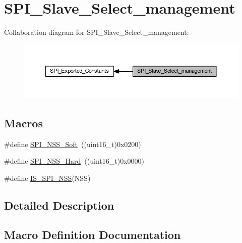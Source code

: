 \hypertarget{group___s_p_i___slave___select__management}{}\section{S\+P\+I\+\_\+\+Slave\+\_\+\+Select\+\_\+management}
\label{group___s_p_i___slave___select__management}
Collaboration diagram for S\+P\+I\+\_\+\+Slave\+\_\+\+Select\+\_\+management\+:
\nopagebreak
\begin{figure}[H]
\begin{center}
\leavevmode
\includegraphics[width=350pt]{group___s_p_i___slave___select__management}
\end{center}
\end{figure}
\subsection*{Macros}
\begin{DoxyCompactItemize}
\item 
\#define \hyperlink{group___s_p_i___slave___select__management_ga105969ee7eb635414da35b41e942e383}{S\+P\+I\+\_\+\+N\+S\+S\+\_\+\+Soft}~((uint16\+\_\+t)0x0200)
\item 
\#define \hyperlink{group___s_p_i___slave___select__management_ga07c547459d39fb7a6e0322147a60b74a}{S\+P\+I\+\_\+\+N\+S\+S\+\_\+\+Hard}~((uint16\+\_\+t)0x0000)
\item 
\#define \hyperlink{group___s_p_i___slave___select__management_gabbeedf42eccef1bae4f88c606fc3b261}{I\+S\+\_\+\+S\+P\+I\+\_\+\+N\+SS}(N\+SS)
\end{DoxyCompactItemize}


\subsection{Detailed Description}


\subsection{Macro Definition Documentation}
\mbox{\label{group___s_p_i___slave___select__management_gabbeedf42eccef1bae4f88c606fc3b261}} 
